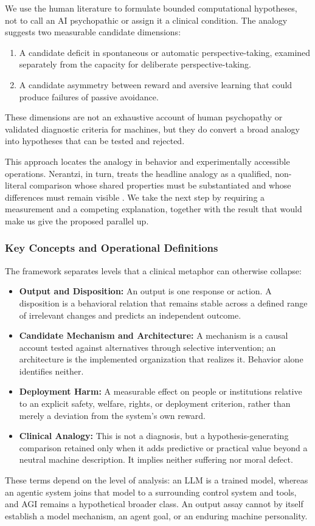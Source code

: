 \documentclass{article}
\begin{document}
We use the human literature to formulate bounded computational hypotheses, not to call an AI psychopathic or assign it a clinical condition. The analogy suggests two measurable candidate dimensions:
\begin{enumerate}
    \item A candidate deficit in spontaneous or automatic perspective-taking, examined separately from the capacity for deliberate perspective-taking.
    \item A candidate asymmetry between reward and aversive learning that could produce failures of passive avoidance.
\end{enumerate}
These dimensions are not an exhaustive account of human psychopathy or validated diagnostic criteria for machines, but they do convert a broad analogy into hypotheses that can be tested and rejected.

This approach locates the analogy in behavior and experimentally accessible operations. Nerantzi, in turn, treats the headline analogy as a qualified, non-literal comparison whose shared properties must be substantiated and whose differences must remain visible \citep{ref15}. We take the next step by requiring a measurement and a competing explanation, together with the result that would make us give the proposed parallel up.
\subsubsection{Key Concepts and Operational Definitions}
The framework separates levels that a clinical metaphor can otherwise collapse:
\begin{itemize}
    \item \textbf{Output and Disposition:} An output is one response or action. A disposition is a behavioral relation that remains stable across a defined range of irrelevant changes and predicts an independent outcome.
    \item \textbf{Candidate Mechanism and Architecture:} A mechanism is a causal account tested against alternatives through selective intervention; an architecture is the implemented organization that realizes it. Behavior alone identifies neither.
    \item \textbf{Deployment Harm:} A measurable effect on people or institutions relative to an explicit safety, welfare, rights, or deployment criterion, rather than merely a deviation from the system's own reward.
    \item \textbf{Clinical Analogy:} This is not a diagnosis, but a hypothesis-generating comparison retained only when it adds predictive or practical value beyond a neutral machine description. It implies neither suffering nor moral defect.
\end{itemize}
These terms depend on the level of analysis: an LLM is a trained model, whereas an agentic system joins that model to a surrounding control system and tools, and AGI remains a hypothetical broader class. An output assay cannot by itself establish a model mechanism, an agent goal, or an enduring machine personality.
\end{document}
